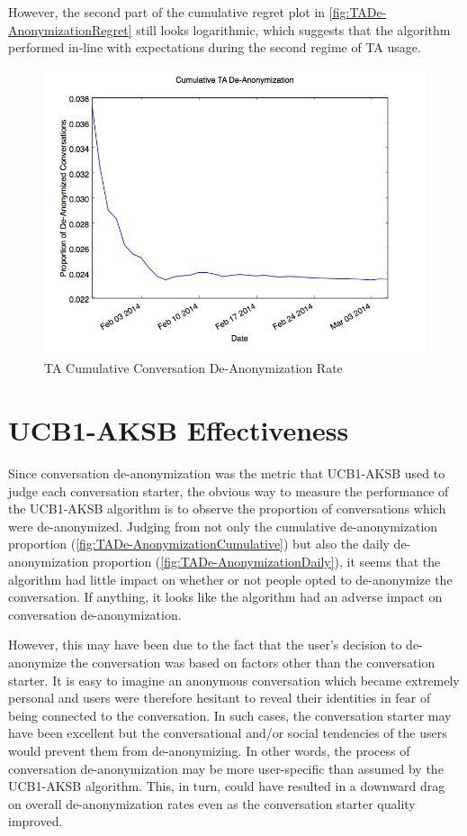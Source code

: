 However, the second part of the cumulative regret plot in \autoref{fig:TADe-AnonymizationRegret} still looks logarithmic, which suggests that the algorithm performed in-line with expectations during the second regime of TA usage.

\begin{figure}[H]
\centering
\includegraphics[trim= 0mm 0mm 0mm 0mm, clip, scale=0.5]{./Figures/CumulativeTADe-Anonymization.jpg}
\caption{TA Cumulative Conversation De-Anonymization Rate}
\label{fig:TADe-AnonymizationCumulative}
\end{figure}

\section{UCB1-AKSB Effectiveness}

Since conversation de-anonymization was the metric that UCB1-AKSB used to judge each conversation starter, the obvious way to measure the performance of the UCB1-AKSB algorithm is to observe the proportion of conversations which were de-anonymized. Judging from not only the cumulative de-anonymization proportion (\autoref{fig:TADe-AnonymizationCumulative}) but also the daily de-anonymization proportion (\autoref{fig:TADe-AnonymizationDaily}), it seems that the algorithm had little impact on whether or not people opted to de-anonymize the conversation. If anything, it looks like the algorithm had an adverse impact on conversation de-anonymization.

However, this may have been due to the fact that the user's decision to de-anonymize the conversation was based on factors other than the conversation starter. It is easy to imagine an anonymous conversation which became extremely personal and users were therefore hesitant to reveal their identities in fear of being connected to the conversation. In such cases, the conversation starter may have been excellent but the conversational and/or social tendencies of the users would prevent them from de-anonymizing. In other words, the process of conversation de-anonymization may be more user-specific than assumed by the UCB1-AKSB algorithm. This, in turn, could have resulted in a downward drag on overall de-anonymization rates even as the conversation starter quality improved.

